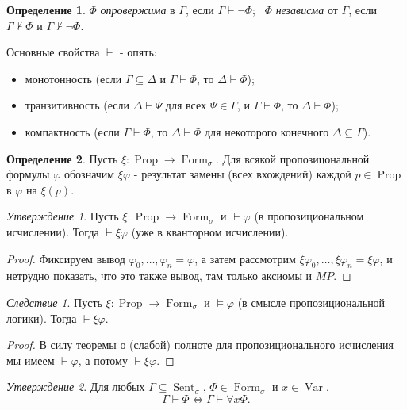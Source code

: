 \documentclass[a4paper,100pt]{article}
\theoremstyle{indented}
\theoremstyle{definition}
\newtheorem{defn}{Определение}
\theoremstyle{remark}
\newtheorem{cons}{Следствие}
\newtheorem{stat}{Утверждение}
\DeclareMathOperator{\ra}{\rightarrow}
\DeclareMathOperator{\Prop}{Prop}
\DeclareMathOperator{\form}{Form}
\DeclareMathOperator{\Var}{Var}
\DeclareMathOperator{\Sent}{Sent}
\begin{document}
\begin{defn}
  $\Phi$ \textit{опровержима} в $\Gamma$, если $\Gamma \vdash \neg \Phi$; \ 
  $\Phi$ \textit{независма} от $\Gamma$, если $\Gamma \nvdash \Phi$ и $\Gamma \nvdash \neg \Phi$. 
\end{defn}

Основные свойства $\vdash$ - опять:

\begin{itemize}
  \item монотонность (если $\Gamma \subseteq \Delta$ и $\Gamma \vdash \Phi$, то $\Delta \vdash \Phi$); 
  \item транзитивность (если $\Delta \vdash \Psi$ для всех $\Psi \in \Gamma$, и $\Gamma \vdash \Phi$, то $\Delta \vdash \Phi$);
  \item компактность (если $\Gamma \vdash \Phi$, то $\Delta \vdash \Phi$ для некоторого конечного $\Delta \subseteq \Gamma$).
\end{itemize}

\begin{defn}
  Пусть $\xi: \Prop \rightarrow \form_\sigma$. Для всякой пропозицональной формулы $\varphi$ обозначим $\xi \varphi$ - результат замены (всех вхождений) каждой $p\in \Prop$ в $\varphi$ на $\xi(p)$. 
\end{defn}

\begin{stat}
  Пусть $\xi: \Prop \ra \form_\sigma$ и $\vdash \varphi$ (в пропозициональном исчислении). Тогда $\vdash \xi\varphi$ (уже в кванторном исчислении).
\end{stat}

\begin{proof}
  Фиксируем вывод $\varphi_0, \ldots, \varphi_n = \varphi$, а затем рассмотрим $\xi\varphi_0, \ldots, \xi\varphi_n = \xi\varphi$, и нетрудно показать, что это также вывод, там только аксиомы и $MP$. 
\end{proof}

\begin{cons}
  Пусть $\xi: \Prop \ra \form_\sigma$ и $\vDash \varphi$ (в смысле пропозициональной логики). Тогда $\vdash \xi \varphi$. 
\end{cons}

\begin{proof}
  В силу теоремы о (слабой) полноте для пропозиционального исчисления мы имеем $\vdash \varphi$, а потому $\vdash \xi \varphi$. 
\end{proof}

\begin{stat}
  Для любых $\Gamma \subseteq \Sent_\sigma$, $\Phi \in \form_\sigma$ и $x\in \Var$. 
  \[
    \Gamma \vdash \Phi \Longleftrightarrow \Gamma \vdash \forall x \Phi. 
  \]
\end{stat}
\end{document}

